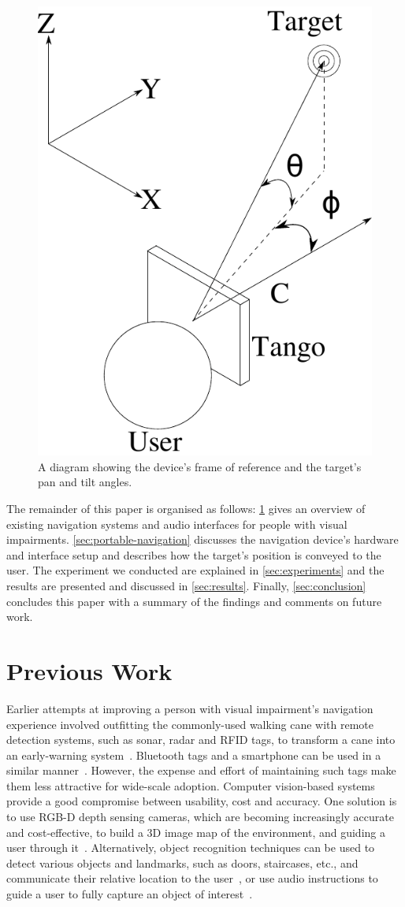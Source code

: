 \documentclass[sigconf, screen=true, anonymous=true]{acmart}
\begin{document}
\begin{figure}
  \centering
  \includegraphics[width=0.4\columnwidth]{figures/camera_coordinate.pdf}
  \caption{A diagram showing the device's frame of reference and the target's pan and tilt angles.}\label{fig:cam-coords}
\end{figure}

The remainder of this paper is organised as follows: \cref{sec:lit-review} gives an overview of existing navigation systems and audio interfaces for people with visual impairments.
\cref{sec:portable-navigation} discusses the navigation device's hardware and interface setup and describes how the target's position is conveyed to the user.
The experiment we conducted are explained in \cref{sec:experiments} and the results are presented and discussed in \cref{sec:results}. 
Finally, \cref{sec:conclusion} concludes this paper with a summary of the findings and comments on future work. 

\section{Previous Work}\label{sec:lit-review}

Earlier attempts at improving a person with visual impairment's navigation experience involved outfitting the commonly-used walking cane with remote detection systems, such as sonar, radar and RFID tags, to transform a cane into an early-warning system~\cite{ulrich1997,marion2008batcane,faria2010electronic,willis2005}.
Bluetooth tags and a smartphone can be used in a similar manner~\cite{sato2017navcog3}.
However, the expense and effort of maintaining such tags make them less attractive for wide-scale adoption.
Computer vision-based systems provide a good compromise between usability, cost and accuracy.
One solution is to use RGB-D depth sensing cameras, which are becoming increasingly accurate and cost-effective, to build a 3D image map of the environment, and guiding a user through it~\cite{lee2015, rodriguez2012obstacle}.
Alternatively, object recognition techniques can be used to detect various objects and landmarks, such as doors, staircases, etc., and communicate their relative location to the user~\cite{schauerte2012assistive, tian2013b, fiannaca2014headlock}, or use audio instructions to guide a user to fully capture an object of interest~\cite{vazquez2012helping}. 
\end{document}
